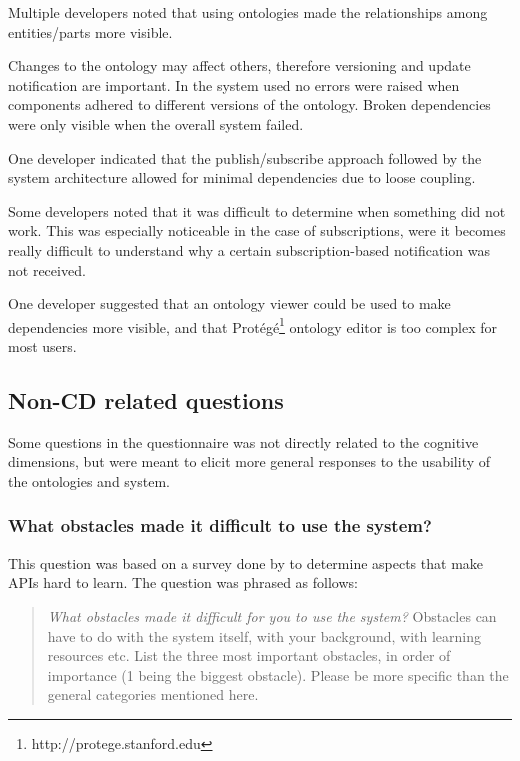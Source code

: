 Multiple developers noted that using ontologies made the relationships among entities/parts more visible. 

Changes to the ontology may affect others, therefore versioning and update notification are important. In the system used no errors were raised when components adhered to different versions of the ontology. Broken dependencies were only visible when the overall system failed.

One developer indicated that the publish/subscribe approach followed by the system architecture allowed for minimal dependencies due to loose coupling.

Some developers noted that it was difficult to determine when something did not work. This was especially noticeable in the case of subscriptions, were it becomes really difficult to understand why a certain subscription-based notification was not received.

One developer suggested that an ontology viewer could be used to make dependencies more visible, and that Prot\'eg\'e\footnote{http://protege.stanford.edu} ontology editor is too complex for most users.





\subsection{Non-CD related questions}

Some questions in the questionnaire was not directly related to the cognitive dimensions, but were meant to elicit more general responses to the usability of the ontologies and system.

\subsubsection{What obstacles made it difficult to use the system?}

This question was based on a survey done by \cite{Robillard2009} to determine aspects that make APIs hard to learn. The question was phrased as follows:

\begin{quote}
\emph{What obstacles made it difficult for you to use the system? }Obstacles can have to do with the system itself, with your background, with learning resources etc. List the three most important obstacles, in order of importance (1 being the biggest obstacle). Please be more specific than the general categories mentioned here.
\end{quote}

